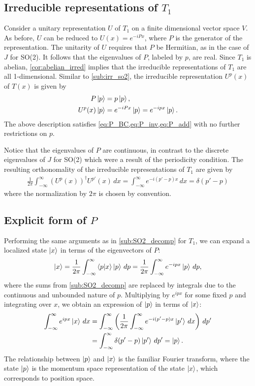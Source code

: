     \subsection{Irreducible representations of $T_1$}
    Consider a unitary representation $U$ of $T_1$ on a finite dimensional vector space $V$. As before, $U$ can be reduced to $U(x) = e^{-iPx}$, where $P$ is the generator of the representation. The unitarity of $U$ requires that $P$ be Hermitian, as in the case of $J$ for SO(2). It follows that the eigenvalues of $P$, labeled by $p$, are real. Since $T_1$ is abelian, \cref{cor:abelian_irred} implies that the irreducible representations of $T_1$ are all 1-dimensional. Similar to \cref{sub:irr_so2}, the irreducible representation $U^p(x)$ of $T(x)$ is given by
    \begin{align*}
        P\ket{p} &= p\ket{p}, \\
        U^p(x)\ket{p} &= e^{-iPx}\ket{p} = e^{-ip x}\ket{p}.
    \end{align*}
    The above description satisfies \cref{eq:P_BC,eq:P_inv,eq:P_add} with no further restrictions on $p$. 
    
    Notice that the eigenvalues of $P$ are continuous, in contrast to the discrete eigenvalues of $J$ for SO(2) which were a result of the periodicity condition. The resulting orthonomality of the irreducible representations of $T_1$ are given by
    \begin{align*}
        \frac{1}{2\pi}\int_{-\infty}^{\infty} {(U^p(x))}^\dagger U^{p'}(x) \,dx = \int_{-\infty}^{\infty} e^{-i(p'-p)x} \,dx = \delta(p'-p)
    \end{align*}
    where the normalization by $2\pi$ is chosen by convention.

    \subsection{Explicit form of $P$}\label{sub:explicit_P}

    Performing the same arguments as in \cref{sub:SO2_decomp} for $T_1$, we can expand a localized state $\ket{x}$  in terms of the eigenvectors of $P$:
    \begin{align*}
        \ket{x} = \frac{1}{2\pi}\int_{-\infty}^{\infty} \braket{p|x}\ket{p} \,dp = \frac{1}{2\pi}\int_{-\infty}^{\infty} e^{-ipx}\ket{p} \,dp,
    \end{align*}
    where the sums from \cref{sub:SO2_decomp} are replaced by integrals due to the continuous and unbounded nature of $p$. Multiplying by $e^{ipx}$ for some fixed $p$ and integrating over $x$, we obtain an expression of $\ket{p}$ in terms of $\ket{x}$:
    \begin{align*}
        \int_{-\infty}^{\infty} e^{ipx}\ket{x} \,dx
            &= \int_{-\infty}^{\infty} \left(\frac{1}{2\pi} \int_{-\infty}^{\infty} e^{-i(p'-p)x}\ket{p'} \,dx \right)\,dp' \\
            &= \int_{-\infty}^{\infty} \delta(p'-p) \ket{p'} \,dp' = \ket{p}.
    \end{align*}
    The relationship between $\ket{p}$ and $\ket{x}$ is the familiar Fourier transform, where the state $\ket{p}$ is the momentum space representation of the state $\ket{x}$, which corresponds to position space.


